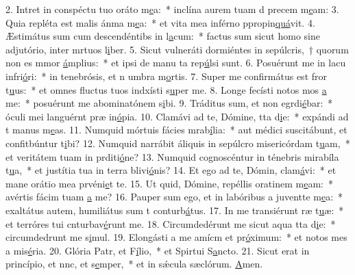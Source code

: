 2. Intret in conspéctu tuo oráto m\uline{e}a:~* inclína aurem tuam d precem m\uline{e}am:
3. Quia repléta est malis ánma m\uline{e}a:~* et vita mea inférno ppropin\uline{quá}vit.
4. Æstimátus sum cum descendéntibs in l\uline{a}cum:~* factus sum sicut homo sine adjutório, inter mrtuos l\uline{i}ber.
5. Sicut vulneráti dormiéntes in sepúlcris,~† quorum non es mmor \uline{á}mplius:~* et ipsi de manu ta rep\uline{ú}lsi sunt.
6. Posuérunt me in lacu infri\uline{ó}ri:~* in tenebrósis, et n umbra m\uline{o}rtis.
7. Super me confirmátus est fror t\uline{u}us:~* et omnes fluctus tuos indxísti s\uline{u}per me.
8. Longe fecísti notos mos \uline{a} me:~* posuérunt me abominatónem s\uline{i}bi.
9. Tráditus sum, et non egrdi\uline{é}bar:~* óculi mei languérnt præ in\uline{ó}pia.
10. Clamávi ad te, Dómine, tta d\uline{i}e:~* expándi ad t manus m\uline{e}as.
11. Numquid mórtuis fácies mrab\uline{í}lia:~* aut médici suscitábunt, et confitbúntur t\uline{i}bi?
12. Numquid narrábit áliquis in sepúlcro misericórdam t\uline{u}am,~* et veritátem tuam in prditi\uline{ó}ne?
13. Numquid cognoscéntur in ténebris mirabíla t\uline{u}a,~* et justítia tua in terra blivi\uline{ó}nis?
14. Et ego ad te, Dómin, clam\uline{á}vi:~* et mane orátio mea prvéni\uline{e}t te.
15. Ut quid, Dómine, repéllis oratinem m\uline{e}am:~* avértis fácim tuam \uline{a} me?
16. Pauper sum ego, et in labóribus a juventte m\uline{e}a:~* exaltátus autem, humiliátus sum t conturb\uline{á}tus.
17. In me transiérunt ræ t\uline{u}æ:~* et terróres tui cnturbav\uline{é}runt me.
18. Circumdedérunt me sicut aqua tta d\uline{i}e:~* circumdedrunt me s\uline{i}mul.
19. Elongásti a me amícm et pr\uline{ó}ximum:~* et notos mes a mis\uline{é}ria.
20. Glória Patr, et F\uline{í}lio,~* et Spirtui S\uline{a}ncto.
21. Sicut erat in princípio, et nnc, et s\uline{e}mper,~* et in sǽcula sæclórum. \uline{A}men.
